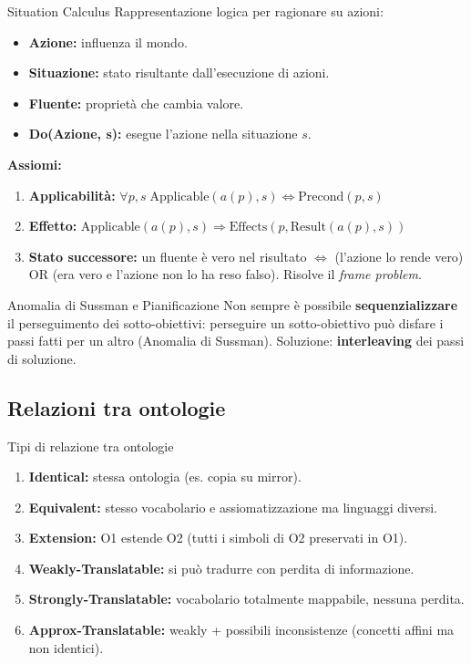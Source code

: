 \documentclass[12pt,a4paper]{article}
\begin{document}
\begin{defbox}{Situation Calculus}
Rappresentazione logica per ragionare su azioni:
\begin{itemize}[noitemsep]
  \item \textbf{Azione:} influenza il mondo.
  \item \textbf{Situazione:} stato risultante dall'esecuzione di azioni.
  \item \textbf{Fluente:} proprietà che cambia valore.
  \item \textbf{Do(Azione, s):} esegue l'azione nella situazione $s$.
\end{itemize}

\textbf{Assiomi:}
\begin{enumerate}[noitemsep]
  \item \textbf{Applicabilità:} $\forall p,s\; \text{Applicable}(a(p), s) \Leftrightarrow \text{Precond}(p, s)$
  \item \textbf{Effetto:} $\text{Applicable}(a(p), s) \Rightarrow \text{Effects}(p, \text{Result}(a(p), s))$
  \item \textbf{Stato successore:} un fluente è vero nel risultato $\Leftrightarrow$ (l'azione lo rende vero) OR (era vero e l'azione non lo ha reso falso). Risolve il \emph{frame problem}.
\end{enumerate}
\end{defbox}

\begin{warnbox}{Anomalia di Sussman e Pianificazione}
Non sempre è possibile \textbf{sequenzializzare} il perseguimento dei sotto-obiettivi: perseguire un sotto-obiettivo può disfare i passi fatti per un altro (Anomalia di Sussman). Soluzione: \textbf{interleaving} dei passi di soluzione.
\end{warnbox}

\subsection{Relazioni tra ontologie}

\begin{defbox}{Tipi di relazione tra ontologie}
\begin{enumerate}[noitemsep]
  \item \textbf{Identical:} stessa ontologia (es. copia su mirror).
  \item \textbf{Equivalent:} stesso vocabolario e assiomatizzazione ma linguaggi diversi.
  \item \textbf{Extension:} O1 estende O2 (tutti i simboli di O2 preservati in O1).
  \item \textbf{Weakly-Translatable:} si può tradurre con perdita di informazione.
  \item \textbf{Strongly-Translatable:} vocabolario totalmente mappabile, nessuna perdita.
  \item \textbf{Approx-Translatable:} weakly + possibili inconsistenze (concetti affini ma non identici).
\end{enumerate}
\end{defbox}
\end{document}
